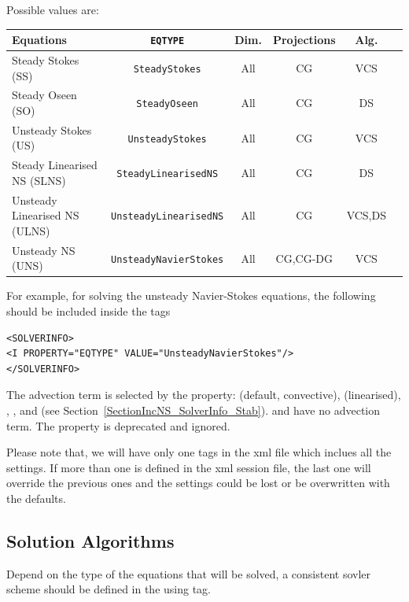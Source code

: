 Possible values are:
\begin{center}
\footnotesize
\renewcommand\arraystretch{1.2}
\begin{tabular}{lccccc}
\toprule
{Equations} & {\texttt{EQTYPE}} &{Dim.}&{Projections} & Alg.\\
\midrule
Steady Stokes (SS)& \texttt{SteadyStokes} & All & CG &VCS \\
Steady Oseen (SO) & \texttt{SteadyOseen} & All & CG& DS \\
Unsteady Stokes (US) & \texttt{UnsteadyStokes} & All & CG &VCS \\
Steady Linearised NS (SLNS) & \texttt{SteadyLinearisedNS} & All & CG & DS \\
Unsteady Linearised NS (ULNS) & \texttt{UnsteadyLinearisedNS} & All & CG & VCS,DS \\
Unsteady NS (UNS) & \texttt{UnsteadyNavierStokes} & All & CG,CG-DG & VCS\\
\bottomrule
\end{tabular}
\end{center}

For example, for solving the unsteady Navier-Stokes equations, the following 
should be included inside the  tags

\begin{lstlisting}[style=XMLStyle]
<SOLVERINFO>
<I PROPERTY="EQTYPE" VALUE="UnsteadyNavierStokes"/>
</SOLVERINFO>
\end{lstlisting}

The advection term is selected by the  property:
 (default, convective),  (linearised),
, ,  and
 (see Section~\ref{SectionIncNS_SolverInfo_Stab}).
 and  have no advection term.
The  property is deprecated and ignored.

Please note that, we will have only one  tags in the xml file
which inclues all the settings. If more than one  is defined
in the xml session file, the last one will override the previous ones and the
settings could be lost or be overwritten with the defaults.


\subsection{Solution Algorithms}
Depend on the type of the equations that will be solved, a consistent sovler 
scheme should be defined in the  using  tag.

